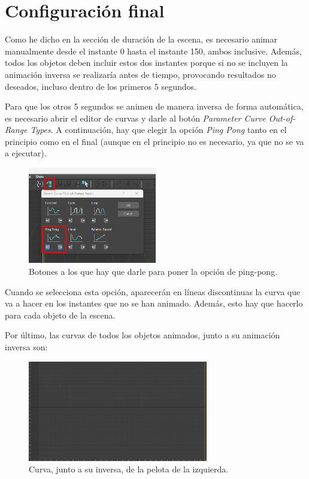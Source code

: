 \section{Configuración final}

Como he dicho en la sección de duración de la escena, es necesario animar manualmente desde el instante 0 hasta el instante 150, ambos inclusive. Además, todos los objetos deben incluir estos dos instantes porque si no se incluyen la animación inversa se realizaría antes de tiempo, provocando resultados no deseados, incluso dentro de los primeros 5 segundos. 

\bigskip

Para que los otros 5 segundos se animen de manera inversa de forma automática, es necesario abrir el editor de curvas y darle al botón \textit{Parameter Curve Out-of-Range Types}. A continuación, hay que elegir la opción \textit{Ping Pong} tanto en el principio como en el final (aunque en el principio no es necesario, ya que no se va a ejecutar).

\begin{figure}[H]
   \centering
   \includegraphics[width=0.5\textwidth]{imagenes/misc/ping-pong.png}
   \caption{Botones a los que hay que darle para poner la opción de ping-pong.}
\end{figure}

Cuando se selecciona esta opción, aparecerán en líneas discontinuas la curva que va a hacer en los instantes que no se han animado. Además, esto hay que hacerlo para cada objeto de la escena.

\bigskip

Por último, las curvas de todos los objetos animados, junto a su animación inversa son:

\begin{figure}[H]
   \centering
   \includegraphics[width=0.7\textwidth]{imagenes/curvas finales/PL.png}
   \caption{Curva, junto a su inversa, de la pelota de la izquierda.}
\end{figure}

